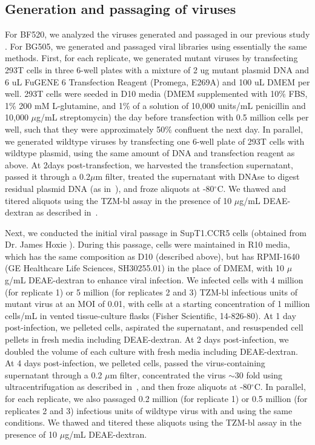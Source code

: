\documentclass[9pt]{elife}
\begin{document}
\subsection{Generation and passaging of viruses}
For BF520, we analyzed the viruses generated and passaged in our previous study \cite{dingens2017comprehensive}.
For BG505, we generated and passaged viral libraries using essentially the same methods.
First, for each replicate, we generated mutant viruses by transfecting 293T cells in three 6-well plates with a mixture of 2 ug mutant plasmid DNA and 6 uL FuGENE 6 Transfection Reagent (Promega, E269A) and 100 uL DMEM per well.
293T cells were seeded in D10 media (DMEM supplemented with 10\% FBS, 1\% 200 mM L-glutamine, and 1\% of a solution of 10,000 units/mL penicillin and 10,000 $\mu$g/mL streptomycin) the day before transfection with 0.5 million cells per well, such that they were approximately 50\% confluent the next day.
In parallel, we generated wildtype viruses by transfecting one 6-well plate of 293T cells with wildtype plasmid, using the same amount of DNA and transfection reagent as above.
At 2days post-transfection, we harvested the transfection supernatant, passed it through a 0.2$\mu$m filter, treated the supernatant with DNAse to digest residual plasmid DNA (as in~\cite{haddox2016experimental}), and froze aliquots at -80$^{\circ}$C.
We thawed and titered aliquots using the TZM-bl assay in the presence of 10 $\mu$g/mL DEAE-dextran as described in~\cite{dingens2017comprehensive}.

Next, we conducted the initial viral passage in SupT1.CCR5 cells (obtained from Dr. James Hoxie \cite{boyd2015mutations}).
During this passage, cells were maintained in R10 media, which has the same composition as D10 (described above), but has RPMI-1640 (GE Healthcare Life Sciences, SH30255.01) in the place of DMEM, with 10 $\mu$g/mL DEAE-dextran to enhance viral infection.
We infected cells with 4 million (for replicate 1) or 5 million (for replicates 2 and 3) TZM-bl infectious units of mutant virus at an MOI of 0.01, with cells at a starting concentration of 1 million cells/mL in vented tissue-culture flasks (Fisher Scientific, 14-826-80).
At 1 day post-infection, we pelleted cells, aspirated the supernatant, and resuspended cell pellets in fresh media including DEAE-dextran.
At 2 days post-infection, we doubled the volume of each culture with fresh media including DEAE-dextran.
At 4 days post-infection, we pelleted cells, passed the virus-containing supernatant through a 0.2 $\mu$m filter, concentrated the virus $\sim$30 fold using ultracentrifugation as described in~\cite{dingens2017comprehensive}, and then froze aliquots at -80$^{\circ}$C.
In parallel, for each replicate, we also passaged 0.2 million (for replicate 1) or 0.5 million (for replicates 2 and 3) infectious units of wildtype virus with and using the same conditions.
We thawed and titered these aliquots using the TZM-bl assay in the presence of 10 $\mu$g/mL DEAE-dextran.
\end{document}
